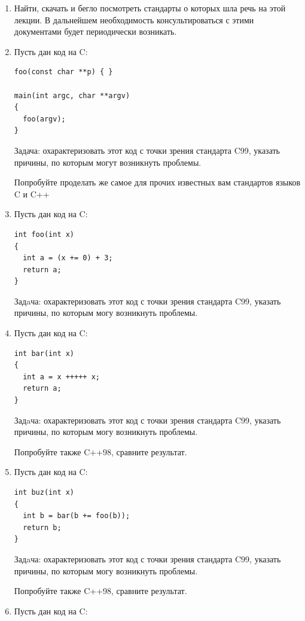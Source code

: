 \documentclass[a4paper,12pt,oneside]{article}
\begin{document}
\begin{enumerate}
\item
Найти, скачать и бегло посмотреть стандарты о которых шла речь на этой лекции. В дальнейшем необходимость консультироваться с этими документами будет периодически возникать.
\item
Пусть дан код на C:

\begin{lstlisting}
foo(const char **p) { }

main(int argc, char **argv)
{
  foo(argv);
}
\end{lstlisting}

Задача: охарактеризовать этот код с точки зрения стандарта C99, указать причины, по которым могут возникнуть проблемы.

Попробуйте проделать же самое для прочих известных вам стандартов языков C и C++

\item
Пусть дан код на C:

\begin{lstlisting}
int foo(int x) 
{
  int a = (x += 0) + 3;
  return a;
}
\end{lstlisting}

Задaча: охарактеризовать этот код с точки зрения стандарта C99, указать причины, по которым могу возникнуть проблемы.

\item
Пусть дан код на C:

\begin{lstlisting}
int bar(int x) 
{
  int a = x +++++ x;
  return a;
}
\end{lstlisting}

Задaча: охарактеризовать этот код с точки зрения стандарта C99, указать причины, по которым могу возникнуть проблемы.

Попробуйте также C++98, сравните результат.

\item
Пусть дан код на C:

\begin{lstlisting}
int buz(int x) 
{
  int b = bar(b += foo(b));
  return b;
}
\end{lstlisting}

Задaча: охарактеризовать этот код с точки зрения стандарта C99, указать причины, по которым могу возникнуть проблемы. 

Попробуйте также C++98, сравните результат.

\item
Пусть дан код на C:


\end{enumerate}
\end{document}
